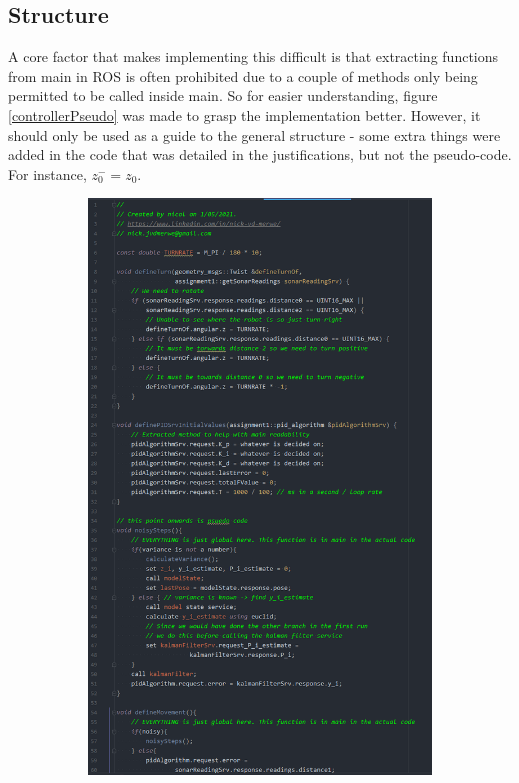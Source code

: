 \documentclass{article}
\begin{document}
\subsection{Structure}
A core factor that makes implementing this difficult is that extracting functions
from main in ROS is often prohibited due to a couple of methods only being
permitted to be called inside main. So for easier understanding, figure
\ref{controllerPseudo} was made to grasp the implementation better. However, it
should only be used as a guide to the general structure - some extra things were
added in the code that was detailed in the justifications, but not the
pseudo-code. For instance, $z_0^-=z_0$.
\begin{figure}[ht]
    \begin{subfigure}{.5\textwidth}
        \centering
        \includegraphics[scale=0.22]{img/pseudocode_1.png}

\end{subfigure}
\end{figure}
\end{document}
